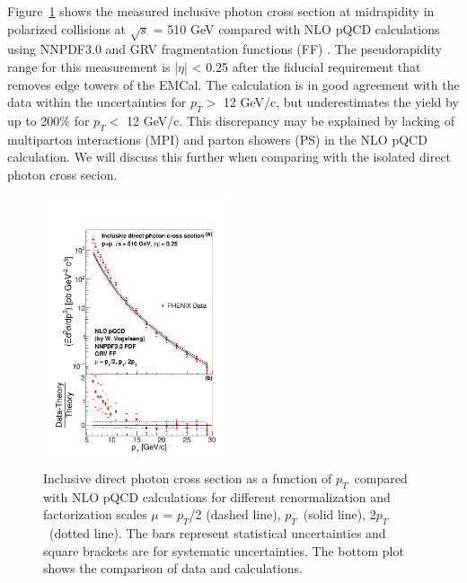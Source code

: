 \documentclass[twocolumn,letterpaper,aps,prl,longbibliography,superscriptaddress,floatfix]{revtex4-2}
\newcommand{\pT}{\ensuremath{p_T}}
\begin{document}
Figure~\ref{fig:inc} shows the measured inclusive photon cross section at midrapidity in polarized collisions at $\sqrt{s}$ = 510 GeV compared with NLO pQCD calculations \cite{PhysRevD.48.3136,PhysRevD.50.1901} using NNPDF3.0 \cite{Ball2015,Bonvini2015} and GRV fragmentation functions (FF) \cite{PhysRevD.45.3986}. The pseudorapidity range for this measurement is |$\eta$| < 0.25 after the fiducial requirement that removes edge towers of the EMCal. The calculation is in good agreement with the data within the uncertainties for $p_T >$ 12 GeV/c, but underestimates the yield by up to 200\% for $p_T <$ 12 GeV/c. This discrepancy may be explained by lacking of multiparton interactions (MPI) and parton showers (PS) in the NLO pQCD calculation. We will discuss this further when comparing with the isolated direct photon cross secion.

\begin{figure}
\includegraphics[width=0.5\textwidth]{CrossSection-photon-werner}
\caption{Inclusive direct photon cross section as a function of \pT\ compared with NLO pQCD calculations \cite{PhysRevD.48.3136,PhysRevD.50.1901} for different renormalization and factorization scales $\mu$ = \pT/2 (dashed line), \pT\ (solid line), 2\pT\ (dotted line). The bars represent statistical uncertainties and square brackets are for systematic uncertainties. The bottom plot shows the comparison of data and calculations.}
\label{fig:inc}
\end{figure}
\end{document}
